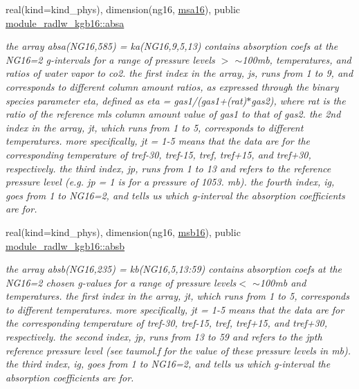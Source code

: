 \begin{DoxyCompactItemize}
\mbox{\label{group__module__radlw__kgbnn_ga2734b420b7e8e8393a8bf1b595a3cf09}} 
real(kind=kind\+\_\+phys), dimension(ng16, \hyperlink{namespacemodule__radlw__kgb16_a95bf5395b579ca6619de3fc40c7ded79}{msa16}), public \hyperlink{group__module__radlw__kgbnn_ga2734b420b7e8e8393a8bf1b595a3cf09}{module\+\_\+radlw\+\_\+kgb16\+::absa}
\begin{DoxyCompactList}\small\item\em the array absa(\+N\+G16,585) = ka(\+N\+G16,9,5,13) contains absorption coefs at the N\+G16=2 g-\/intervals for a range of pressure levels $>$ $\sim$100mb, temperatures, and ratios of water vapor to co2. the first index in the array, js, runs from 1 to 9, and corresponds to different column amount ratios, as expressed through the binary species parameter eta, defined as eta = gas1/(gas1+(rat)$\ast$gas2), where rat is the ratio of the reference mls column amount value of gas1 to that of gas2. the 2nd index in the array, jt, which runs from 1 to 5, corresponds to different temperatures. more specifically, jt = 1-\/5 means that the data are for the corresponding temperature of tref-\/30, tref-\/15, tref, tref+15, and tref+30, respectively. the third index, jp, runs from 1 to 13 and refers to the reference pressure level (e.\+g. jp = 1 is for a pressure of 1053. mb). the fourth index, ig, goes from 1 to N\+G16=2, and tells us which g-\/interval the absorption coefficients are for. \end{DoxyCompactList}\item 
\mbox{\label{group__module__radlw__kgbnn_gae856b42252b71d4d588ea5e19e871cac}} 
real(kind=kind\+\_\+phys), dimension(ng16, \hyperlink{group__module__radlw__kgbnn_ga18ad5b461d6c71b1aa2d82d5694beb03}{msb16}), public \hyperlink{group__module__radlw__kgbnn_gae856b42252b71d4d588ea5e19e871cac}{module\+\_\+radlw\+\_\+kgb16\+::absb}
\begin{DoxyCompactList}\small\item\em the array absb(\+N\+G16,235) = kb(\+N\+G16,5,13\+:59) contains absorption coefs at the N\+G16=2 chosen g-\/values for a range of pressure levels$<$ $\sim$100mb and temperatures. the first index in the array, jt, which runs from 1 to 5, corresponds to different temperatures. more specifically, jt = 1-\/5 means that the data are for the corresponding temperature of tref-\/30, tref-\/15, tref, tref+15, and tref+30, respectively. the second index, jp, runs from 13 to 59 and refers to the jpth reference pressure level (see taumol.\+f for the value of these pressure levels in mb). the third index, ig, goes from 1 to N\+G16=2, and tells us which g-\/interval the absorption coefficients are for. \end{DoxyCompactList}\item 

\end{DoxyCompactItemize}
